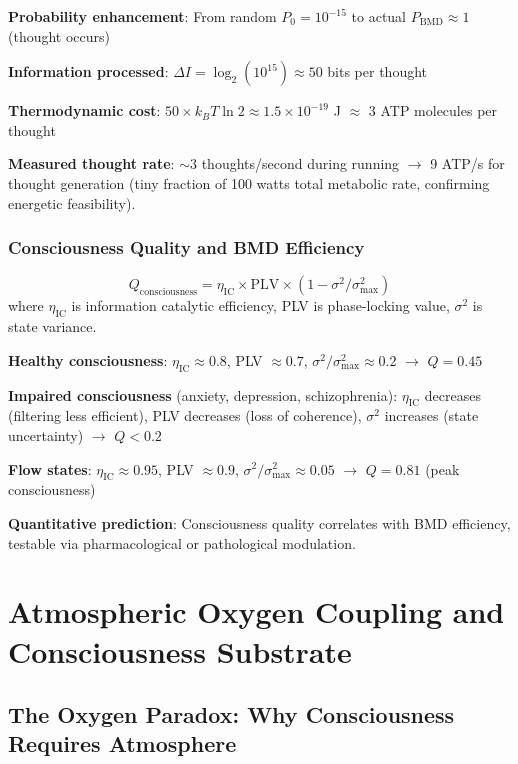 \documentclass[11pt,onecolumn]{article}
\begin{document}
\textbf{Probability enhancement}: From random $P_0 = 10^{-15}$ to actual $P_{\text{BMD}} \approx 1$ (thought occurs)

\textbf{Information processed}: $\Delta I = \log_2(10^{15}) \approx 50$ bits per thought

\textbf{Thermodynamic cost}: $50 \times k_B T \ln 2 \approx 1.5 \times 10^{-19}$ J $\approx$ 3 ATP molecules per thought

\textbf{Measured thought rate}: $\sim 3$ thoughts/second during running $\to$ 9 ATP/s for thought generation (tiny fraction of 100 watts total metabolic rate, confirming energetic feasibility).

\subsubsection{Consciousness Quality and BMD Efficiency}

\begin{definition}
\begin{equation}
Q_{\text{consciousness}} = \eta_{\text{IC}} \times \text{PLV} \times (1 - \sigma^2/\sigma_{\max}^2)
\end{equation}
where $\eta_{\text{IC}}$ is information catalytic efficiency, PLV is phase-locking value, $\sigma^2$ is state variance.
\end{definition}

\textbf{Healthy consciousness}: $\eta_{\text{IC}} \approx 0.8$, PLV $\approx 0.7$, $\sigma^2/\sigma_{\max}^2 \approx 0.2$ $\to$ $Q = 0.45$

\textbf{Impaired consciousness} (anxiety, depression, schizophrenia): $\eta_{\text{IC}}$ decreases (filtering less efficient), PLV decreases (loss of coherence), $\sigma^2$ increases (state uncertainty) $\to$ $Q < 0.2$

\textbf{Flow states}: $\eta_{\text{IC}} \approx 0.95$, PLV $\approx 0.9$, $\sigma^2/\sigma_{\max}^2 \approx 0.05$ $\to$ $Q = 0.81$ (peak consciousness)

\textbf{Quantitative prediction}: Consciousness quality correlates with BMD efficiency, testable via pharmacological or pathological modulation.

\clearpage

\section{Atmospheric Oxygen Coupling and Consciousness Substrate}

\subsection{The Oxygen Paradox: Why Consciousness Requires Atmosphere}
\end{document}
